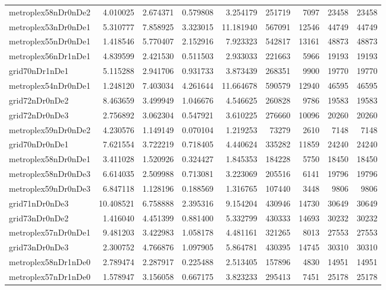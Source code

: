 \begin{longtable}{|l|r|r|r|r|r|r|r|r|}
metroplex58nDr0nDe2 & 4.010025 & 2.674371 & 0.579808 & 3.254179 & 251719 & 7097 & 23458 & 23458 \\
metroplex53nDr0nDe1 & 5.310777 & 7.858925 & 3.323015 & 11.181940 & 567091 & 12546 & 44749 & 44749 \\
metroplex55nDr0nDe1 & 1.418546 & 5.770407 & 2.152916 & 7.923323 & 542817 & 13161 & 48873 & 48873 \\
metroplex56nDr1nDe1 & 4.839599 & 2.421530 & 0.511503 & 2.933033 & 221663 & 5966 & 19193 & 19193 \\
grid70nDr1nDe1 & 5.115288 & 2.941706 & 0.931733 & 3.873439 & 268351 & 9900 & 19770 & 19770 \\
metroplex54nDr0nDe1 & 1.248120 & 7.403034 & 4.261644 & 11.664678 & 590579 & 12940 & 46595 & 46595 \\
grid72nDr0nDe2 & 8.463659 & 3.499949 & 1.046676 & 4.546625 & 260828 & 9786 & 19583 & 19583 \\
grid72nDr0nDe3 & 2.756892 & 3.062304 & 0.547921 & 3.610225 & 276660 & 10096 & 20260 & 20260 \\
metroplex59nDr0nDe2 & 4.230576 & 1.149149 & 0.070104 & 1.219253 & 73279 & 2610 & 7148 & 7148 \\
grid70nDr0nDe1 & 7.621554 & 3.722219 & 0.718405 & 4.440624 & 335282 & 11859 & 24240 & 24240 \\
metroplex58nDr0nDe1 & 3.411028 & 1.520926 & 0.324427 & 1.845353 & 184228 & 5750 & 18450 & 18450 \\
metroplex58nDr0nDe3 & 6.614035 & 2.509988 & 0.713081 & 3.223069 & 205516 & 6141 & 19796 & 19796 \\
metroplex59nDr0nDe3 & 6.847118 & 1.128196 & 0.188569 & 1.316765 & 107440 & 3448 & 9806 & 9806 \\
grid71nDr0nDe3 & 10.408521 & 6.758888 & 2.395316 & 9.154204 & 430946 & 14730 & 30649 & 30649 \\
grid73nDr0nDe2 & 1.416040 & 4.451399 & 0.881400 & 5.332799 & 430333 & 14693 & 30232 & 30232 \\
metroplex57nDr0nDe1 & 9.481203 & 3.422983 & 1.058178 & 4.481161 & 321265 & 8013 & 27553 & 27553 \\
grid73nDr0nDe3 & 2.300752 & 4.766876 & 1.097905 & 5.864781 & 430395 & 14745 & 30310 & 30310 \\
metroplex58nDr1nDe0 & 2.789474 & 2.287917 & 0.225488 & 2.513405 & 157896 & 4830 & 14951 & 14951 \\
metroplex57nDr1nDe0 & 1.578947 & 3.156058 & 0.667175 & 3.823233 & 295413 & 7451 & 25178 & 25178 \\

\end{longtable}
